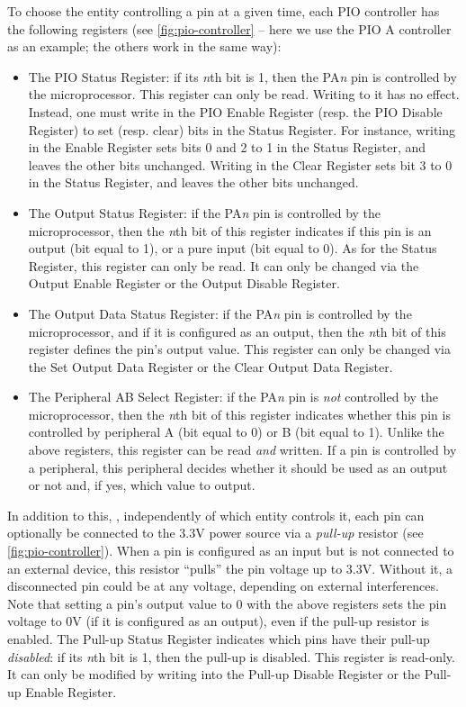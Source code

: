 To choose the entity controlling a pin at a given time, each PIO controller has
the following registers (see \cref{fig:pio-controller} -- here we use the PIO A
controller as an example; the others work in the same way):
\begin{itemize}
  \item The PIO Status Register: if its {\em n}th bit is 1, then the PA{\em n}
  pin is controlled by the microprocessor. This register can only be read.
  Writing to it has no effect. Instead, one must write in the PIO Enable
  Register (resp. the PIO Disable Register) to set (resp. clear) bits in the
  Status Register. For instance, writing  in the Enable Register
  sets bits 0 and 2 to 1 in the Status Register, and leaves the other bits
  unchanged. Writing  in the Clear Register sets bit 3 to 0 in the
  Status Register, and leaves the other bits unchanged.

  \item The Output Status Register: if the PA{\em n} pin is controlled by the
  microprocessor, then the {\em n}th bit of this register indicates if this pin
  is an output (bit equal to 1), or a pure input (bit equal to 0). As for the
  Status Register, this register can only be read. It can only be changed via
  the Output Enable Register or the Output Disable Register.

  \item The Output Data Status Register: if the PA{\em n} pin is controlled by
  the microprocessor, and if it is configured as an output, then the {\em n}th
  bit of this register defines the pin's output value. This register can only
  be changed via the Set Output Data Register or the Clear Output Data
  Register.

  \item The Peripheral AB Select Register: if the PA{\em n} pin is {\em not}
  controlled by the microprocessor, then the {\em n}th bit of this register
  indicates whether this pin is controlled by peripheral A (bit equal to 0) or
  B (bit equal to 1). Unlike the above registers, this register can be read
  {\em and} written. If a pin is controlled by a peripheral, this peripheral
  decides whether it should be used as an output or not and, if yes, which
  value to output.
\end{itemize}

In addition to this, \ie, independently of which entity controls it, each pin
can optionally be connected to the 3.3V power source via a {\em pull-up}
resistor (see \cref{fig:pio-controller}). When a pin is configured as an input
but is not connected to an external device, this resistor ``pulls'' the pin
voltage up to 3.3V. Without it, a disconnected pin could be at any voltage,
depending on external interferences. Note that setting a pin's output value to
0 with the above registers sets the pin voltage to 0V (if it is configured as
an output), even if the pull-up resistor is enabled. The Pull-up Status
Register indicates which pins have their pull-up {\em disabled}: if its {\em
n}th bit is 1, then the pull-up is disabled. This register is read-only. It can
only be modified by writing into the Pull-up Disable Register or the Pull-up
Enable Register.


